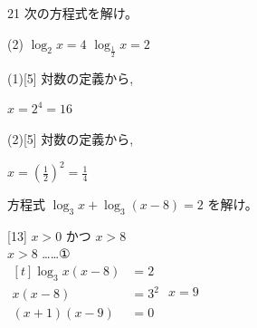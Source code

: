 \documentclass[14pt,dvipdfmx]{jsarticle}
\begin{document}
\vfill
\nextpage

\enlargethispage{2zw}
\begin{practiceprob}{21}
  次の方程式を解け。
  \begin{tasks}[label=(\arabic*), label-width=1.6zw, item-indent=2zw, after-item-skip=0.02em](2)
    \task $\log_{2} x = 4$
    \task $\log_{\frac{1}{2}} x = 2$
  \end{tasks}
\end{practiceprob}
\vspace{-0.15em}
\begin{minipage}[t]{0.48\textwidth}
\begin{answerbox}{(1)}[5]
  対数の定義から,

  $x=2^{4}=16$
\end{answerbox}
\end{minipage}\hfill
\begin{minipage}[t]{0.48\textwidth}
\begin{answerbox}{(2)}[5]
  対数の定義から,

  $x=\left(\frac{1}{2}\right)^{2}=\frac{1}{4}$
\end{answerbox}
\end{minipage}
\vspace{0.25em}

\quad
方程式 $\log_{3} x+\log_{3}(x-8)=2$ を解け。
\vspace{0.06em}

\begin{answerbox}{}[13]
  $x>0$ かつ $x>8$ \\
  $x>8$ \quad ……①\\
  $\begin{aligned}[t]
    \log_{3} x(x-8) &= 2 \\
    x(x-8) &= 3^{2} \\
    (x+1)(x-9) &= 0
  \end{aligned}$
   $x=9$
\end{answerbox}
\end{document}
